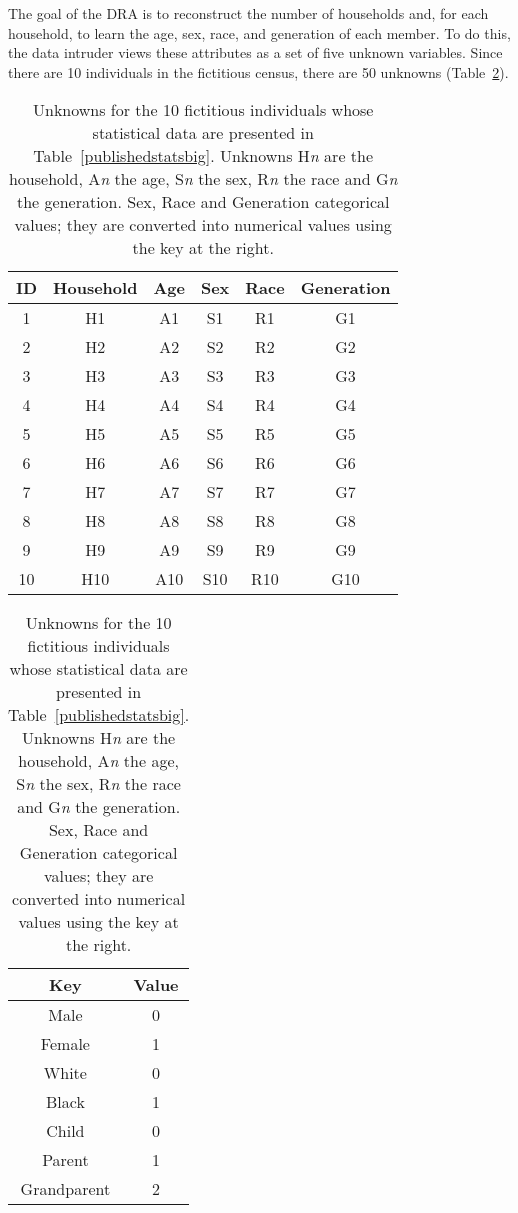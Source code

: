 \documentclass[runningheads]{llncs}
\begin{document}
The goal of the DRA is to reconstruct the number of households and,
for each household, to learn the age, sex, race, and generation of
each member. To do this, the data intruder views these attributes as a set of five
unknown variables. Since there are 10 individuals in
the fictitious census, there are 50 unknowns (Table~\ref{50unknowns}).

\begin{table}
\begin{minipage}[t]{3in}
\begin{tabular}{cccccc}
ID & Household & Age & Sex & Race & Generation \\
\hline
\hline
1 & H1 & A1 & S1 & R1 & G1  \\
\hline
2 & H2 & A2 & S2 & R2 & G2  \\
\hline
3 & H3 & A3 & S3 & R3 & G3  \\
\hline
4 & H4 & A4 & S4 & R4 & G4  \\
\hline
5 & H5 & A5 & S5 & R5 & G5  \\
\hline
6 & H6 & A6 & S6 & R6 & G6  \\
\hline
7 & H7 & A7 & S7 & R7 & G7  \\
\hline
8 & H8 & A8 & S8 & R8 & G8  \\
\hline
9 & H9 & A9 & S9 & R9 & G9  \\
\hline
10 & H10 & A10 & S10 & R10 & G10  \\
\hline
\end{tabular}
\end{minipage}
\begin{minipage}[t]{1in}
\begin{tabular}{c|c}
Key & Value \\
\hline
Male & 0 \\
Female & 1 \\
\hline
White & 0 \\
Black & 1 \\
\hline
Child & 0 \\
Parent & 1 \\
Grandparent & 2 \\
\hline
\end{tabular}
\end{minipage}
\caption{Unknowns for the 10 fictitious individuals whose statistical
  data are presented in Table~\ref{publishedstatsbig}. Unknowns
  H\textit{n} are the household, A\textit{n} the age, S\textit{n} the
  sex, R\textit{n} the race and G\textit{n} the generation. Sex, Race
  and Generation categorical values; they are converted into numerical
  values using the key at the right.}\label{50unknowns}
\end{table}
\end{document}
